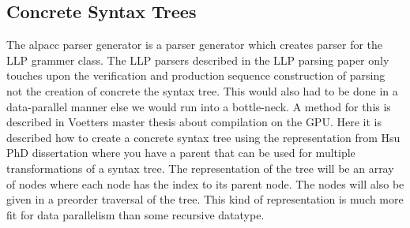 \documentclass[a4paper,12pt]{article}
\theoremstyle{definition}
\begin{document}
\subsection{Concrete Syntax Trees}
The alpacc parser generator is a parser generator which creates parser for the LLP grammer class. The LLP parsers described in the LLP parsing paper \cite{Vagner2007} only touches upon the verification and production sequence construction of parsing not the creation of concrete the syntax tree. This would also had to be done in a data-parallel manner else we would run into a bottle-neck. A method for this is described in Voetters master thesis \cite[32-33]{voetter2021} about compilation on the GPU. Here it is described how to create a concrete syntax tree using the representation from Hsu PhD dissertation \cite[77-81]{hsu2019} where you have a parent that can be used for multiple transformations of a syntax tree. The representation of the tree will be an array of nodes where each node has the index to its parent node. The nodes will also be given in a preorder traversal of the tree. This kind of representation is much more fit for data parallelism than some recursive datatype.
\end{document}

